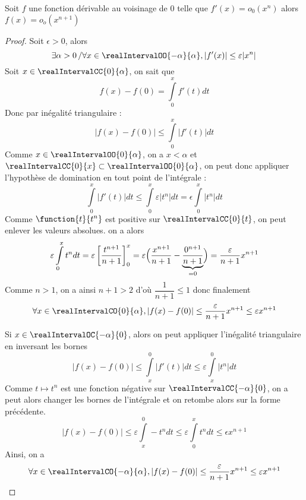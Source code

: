 \begin{lemma}
Soit $f$ une fonction dérivable au voisinage de $0$ telle que $f'(x)= o_{0}(x^n)$ alors $f(x)=o_o(x^{n+1})$
\end{lemma}

\begin{proof}
Soit $\epsilon > 0$, alors 
\[
\exists \alpha > 0 \left/ \forall x \in \realIntervalOO{-\alpha}{\alpha}, |f'(x)|\le \varepsilon |x^n|\right.
\]
Soit $x \in \realIntervalCC{0}{\alpha}$, on sait que 
\[
f(x)-f(0) = \displaystyle\int\limits_{0}^{x} f'(t) dt
\]
Donc par inégalité triangulaire :
\[
|f(x)-f(0)| \le \displaystyle\int\limits_{0}^{x} |f'(t)| dt
\]
Comme $x \in \realIntervalOO{0}{\alpha}$, on a $x < \alpha$ et $\realIntervalCC{0}{x} \subset \realIntervalOO{0}{\alpha}$, on peut donc appliquer l'hypothèse de domination en tout point de l'intégrale :
\[
\displaystyle\int\limits_{0}^{x} |f'(t)| dt \le \displaystyle\int\limits_{0}^{x} \varepsilon |t^n| dt = \epsilon \displaystyle\int\limits_{0}^{x} |t^n| dt
\]
Comme $\function{t}{t^n}$ est positive sur $\realIntervalCC{0}{t}$, on peut enlever les valeurs absolues. on a alors 
\[
\varepsilon \displaystyle\int\limits_{0}^{x} t^n dt 
=
\varepsilon \left[\dfrac{t^{n+1}}{n+1}\right]_{0}^{x} 
= 
\varepsilon \Bigl(\dfrac{x^{n+1}}{n+1} - \underbrace{\dfrac{0^{n+1}}{n+1}}_{=0}\Bigr)
=
\dfrac{\varepsilon}{n+1} x^{n+1}
\]
Comme $n > 1$, on a ainsi $n+1 > 2$ d'où $\dfrac{1}{n+1} \le 1$ donc finalement 
\[
\forall x \in \realIntervalCO{0}{\alpha}, 
|f(x)-f(0)| \le \dfrac{\varepsilon}{n+1} x^{n+1} 
\le 
\varepsilon x^{n+1}
\]

Si $x \in \realIntervalOC{-\alpha}{0}$, alors on peut appliquer l'inégalité triangulaire en inversant les bornes
\[
|f(x)-f(0)| 
\le 
\int\limits_{x}^{0} |f'(t)| dt
\le 
\varepsilon \int\limits_{x}^{0} |t^n| dt
\]
Comme $t \mapsto t^n$ est une fonction négative sur $\realIntervalCC{-\alpha}{0}$, on a peut alors changer les bornes de l'intégrale et on retombe alors sur la forme précédente.
\[
|f(x)-f(0)| 
\le 
\varepsilon \int\limits_{x}^{0} -t^n dt
\le 
\varepsilon \int\limits_{0}^{x} t^n dt
\le \epsilon x^{n+1}
\]
Ainsi, on a 
\[
\forall x \in \realIntervalCO{-\alpha}{\alpha}, 
|f(x)-f(0)| \le \dfrac{\varepsilon}{n+1} x^{n+1} 
\le 
\varepsilon x^{n+1}
\]
\end{proof}